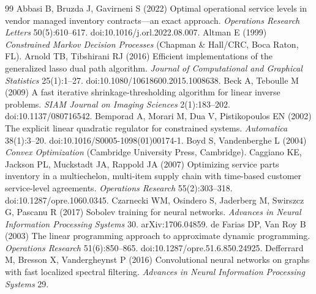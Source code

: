 \documentclass[11pt,letterpaper]{article}
\theoremstyle{definition}
\newcommand{\1}{\mathbf 1}
\begin{document}
\begin{thebibliography}{99}
Abbasi B, Bruzda J, Gavirneni S (2022) Optimal operational service levels in vendor managed inventory contracts---an exact approach. \emph{Operations Research Letters} 50(5):610--617. doi:10.1016/j.orl.2022.08.007.
Altman E (1999) \emph{Constrained Markov Decision Processes} (Chapman \& Hall/CRC, Boca Raton, FL).
Arnold TB, Tibshirani RJ (2016) Efficient implementations of the generalized lasso dual path algorithm. \emph{Journal of Computational and Graphical Statistics} 25(1):1--27. doi:10.1080/10618600.2015.1008638.
Beck A, Teboulle M (2009) A fast iterative shrinkage-thresholding algorithm for linear inverse problems. \emph{SIAM Journal on Imaging Sciences} 2(1):183--202. doi:10.1137/080716542.
Bemporad A, Morari M, Dua V, Pistikopoulos EN (2002) The explicit linear quadratic regulator for constrained systems. \emph{Automatica} 38(1):3--20. doi:10.1016/S0005-1098(01)00174-1.
Boyd S, Vandenberghe L (2004) \emph{Convex Optimization} (Cambridge University Press, Cambridge).
Caggiano KE, Jackson PL, Muckstadt JA, Rappold JA (2007) Optimizing service parts inventory in a multiechelon, multi-item supply chain with time-based customer service-level agreements. \emph{Operations Research} 55(2):303--318. doi:10.1287/opre.1060.0345.
Czarnecki WM, Osindero S, Jaderberg M, Swirszcz G, Pascanu R (2017) Sobolev training for neural networks. \emph{Advances in Neural Information Processing Systems} 30. arXiv:1706.04859.
de Farias DP, Van Roy B (2003) The linear programming approach to approximate dynamic programming. \emph{Operations Research} 51(6):850--865. doi:10.1287/opre.51.6.850.24925.
Defferrard M, Bresson X, Vandergheynst P (2016) Convolutional neural networks on graphs with fast localized spectral filtering. \emph{Advances in Neural Information Processing Systems} 29.

\end{thebibliography}
\end{document}
